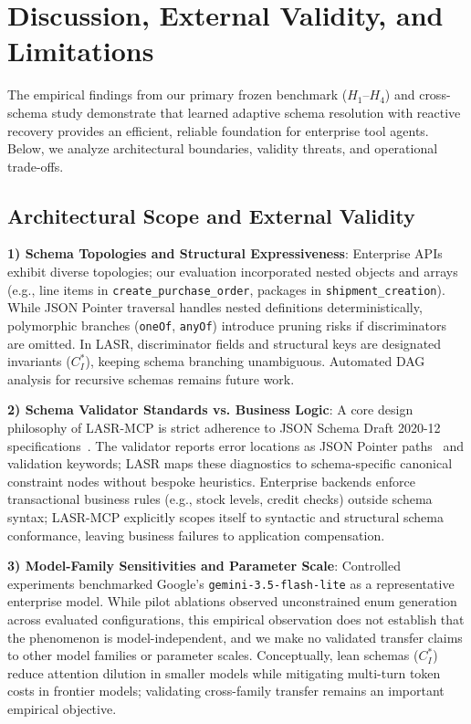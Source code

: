 \section{Discussion, External Validity, and Limitations}
\label{sec:discussion}

The empirical findings from our primary frozen benchmark ($H_1$--$H_4$) and cross-schema study demonstrate that learned adaptive schema resolution with reactive recovery provides an efficient, reliable foundation for enterprise tool agents. Below, we analyze architectural boundaries, validity threats, and operational trade-offs.

\subsection{Architectural Scope and External Validity}
\noindent\textbf{1) Schema Topologies and Structural Expressiveness}: Enterprise APIs exhibit diverse topologies; our evaluation incorporated nested objects and arrays (e.g., line items in \texttt{create\_purchase\_order}, packages in \texttt{shipment\_creation}). While JSON Pointer traversal handles nested definitions deterministically, polymorphic branches (\texttt{oneOf}, \texttt{anyOf}) introduce pruning risks if discriminators are omitted. In LASR, discriminator fields and structural keys are designated invariants ($C_I^*$), keeping schema branching unambiguous. Automated DAG analysis for recursive schemas remains future work.

\noindent\textbf{2) Schema Validator Standards vs. Business Logic}: A core design philosophy of LASR-MCP is strict adherence to JSON Schema Draft 2020-12 specifications~\cite{jsonschema202012}. The validator reports error locations as JSON Pointer paths~\cite{rfc6901} and validation keywords; LASR maps these diagnostics to schema-specific canonical constraint nodes without bespoke heuristics. Enterprise backends enforce transactional business rules (e.g., stock levels, credit checks) outside schema syntax; LASR-MCP explicitly scopes itself to syntactic and structural schema conformance, leaving business failures to application compensation.

\noindent\textbf{3) Model-Family Sensitivities and Parameter Scale}: Controlled experiments benchmarked Google's \texttt{gemini-3.5-flash-lite} as a representative enterprise model. While pilot ablations observed unconstrained enum generation across evaluated configurations, this empirical observation does not establish that the phenomenon is model-independent, and we make no validated transfer claims to other model families or parameter scales. Conceptually, lean schemas ($C_I^*$) reduce attention dilution in smaller models while mitigating multi-turn token costs in frontier models; validating cross-family transfer remains an important empirical objective.

